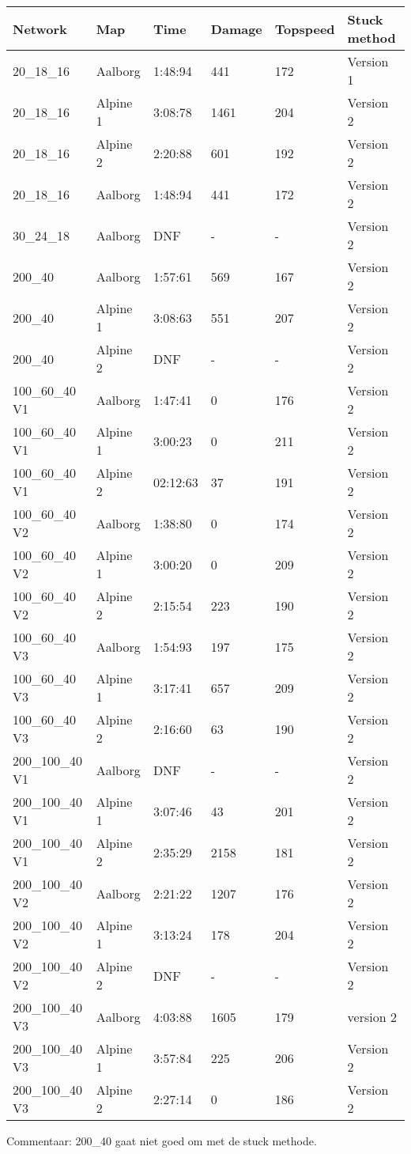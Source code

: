 \documentclass[pt,twoside,a4paper]{article}
\begin{document}
\begin{table}[h]
\noindent
\begin{tabular}{llllll}
 \textbf{Network} & \textbf{Map} & \textbf{Time} & \textbf{Damage} & \textbf{Topspeed}  & \textbf{Stuck method} \\ \hline
 20\_18\_16  & Aalborg & 1:48:94 & 441 & 172 & Version 1 \\
 20\_18\_16 & Alpine 1 & 3:08:78  & 1461 & 204 & Version 2    \\
 20\_18\_16 & Alpine 2 & 2:20:88  & 601 & 192 & Version 2    \\
 20\_18\_16  & Aalborg & 1:48:94 & 441 & 172 & Version 2 \\ \hline
 30\_24\_18  & Aalborg &  DNF & - & - & Version 2 \\ \hline
 200\_40  & Aalborg &  1:57:61 & 569 & 167 & Version 2 \\ 
 200\_40 & Alpine 1 & 3:08:63 & 551 & 207 & Version 2    \\
 200\_40 & Alpine 2 & DNF & - & - & Version 2   \\ \hline 
 100\_60\_40 V1 &  Aalborg & 1:47:41 & 0 & 176 & Version 2 \\
 100\_60\_40 V1 & Alpine 1& 3:00:23 & 0 & 211 & Version 2 \\  
 100\_60\_40 V1 & Alpine 2 & 02:12:63 & 37 & 191 & Version 2   \\ \hline
 100\_60\_40 V2 & Aalborg & 1:38:80  & 0 & 174 & Version 2   \\ 
 100\_60\_40 V2 & Alpine 1 & 3:00:20 & 0 & 209 & Version 2	\\
 100\_60\_40 V2 & Alpine 2 & 2:15:54 & 223 & 190 & Version 2 \\ \hline
 100\_60\_40 V3 & Aalborg & 1:54:93  & 197 & 175 & Version 2   \\ 
 100\_60\_40 V3 & Alpine 1 & 3:17:41  & 657 & 209 & Version 2   \\ 
 100\_60\_40 V3 & Alpine 2 & 2:16:60  & 63 & 190 & Version 2   \\ \hline 
 200\_100\_40 V1 & Aalborg & DNF & - & - & Version 2 \\
 200\_100\_40 V1 & Alpine 1 & 3:07:46 & 43 & 201 & Version 2 \\
 200\_100\_40 V1 & Alpine 2 & 2:35:29 & 2158 & 181 & Version 2 \\ \hline
 200\_100\_40 V2 & Aalborg & 2:21:22 & 1207 & 176 & Version 2 \\
 200\_100\_40 V2 & Alpine 1 & 3:13:24 & 178 & 204 & Version 2 \\
 200\_100\_40 V2 & Alpine 2 & DNF & - & - & Version 2 \\  \hline
 200\_100\_40 V3 & Aalborg & 4:03:88 & 1605 & 179 & version 2 \\
 200\_100\_40 V3 & Alpine 1 & 3:57:84 & 225 & 206 & Version 2 \\
 200\_100\_40 V3 & Alpine 2 & 2:27:14 & 0 & 186 & Version 2 \\ \hline
 
\end{tabular}
\end{table}



Commentaar: 200\_40 gaat niet goed om met de stuck methode.
\newpage
\end{document}

